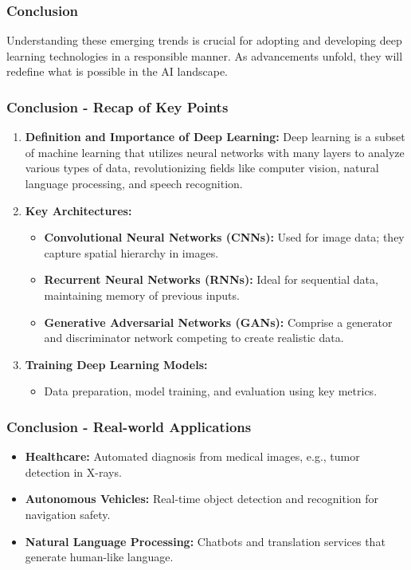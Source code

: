 \documentclass[aspectratio=169]{beamer}
\begin{document}
\begin{frame}[fragile]
    \frametitle{Conclusion}
    Understanding these emerging trends is crucial for adopting and developing deep learning technologies in a responsible manner. As advancements unfold, they will redefine what is possible in the AI landscape.
\end{frame}

\begin{frame}[fragile]
    \frametitle{Conclusion - Recap of Key Points}
    \begin{enumerate}
        \item \textbf{Definition and Importance of Deep Learning:}
        Deep learning is a subset of machine learning that utilizes neural networks with many layers to analyze various types of data, revolutionizing fields like computer vision, natural language processing, and speech recognition.
        
        \item \textbf{Key Architectures:}
        \begin{itemize}
            \item \textbf{Convolutional Neural Networks (CNNs):} Used for image data; they capture spatial hierarchy in images.
            \item \textbf{Recurrent Neural Networks (RNNs):} Ideal for sequential data, maintaining memory of previous inputs.
            \item \textbf{Generative Adversarial Networks (GANs):} Comprise a generator and discriminator network competing to create realistic data.
        \end{itemize}
        
        \item \textbf{Training Deep Learning Models:}
        \begin{itemize}
            \item Data preparation, model training, and evaluation using key metrics.
        \end{itemize}
    \end{enumerate}
\end{frame}

\begin{frame}[fragile]
    \frametitle{Conclusion - Real-world Applications}
    \begin{itemize}
        \item \textbf{Healthcare:} Automated diagnosis from medical images, e.g., tumor detection in X-rays.
        \item \textbf{Autonomous Vehicles:} Real-time object detection and recognition for navigation safety.
        \item \textbf{Natural Language Processing:} Chatbots and translation services that generate human-like language.
    \end{itemize}
\end{frame}
\end{document}
